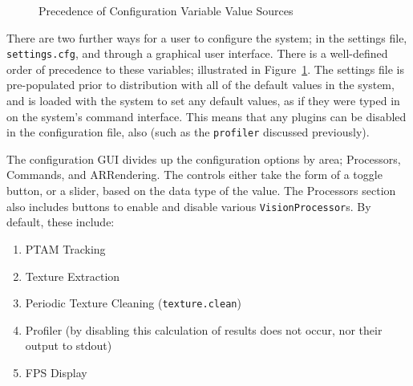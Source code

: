 \documentclass[a4paper,10pt]{report}
\begin{document}
\begin{figure}[h]
  \begin{center}
  \end{center}
  \caption{Precedence of Configuration Variable Value Sources}
  \label{configprecedence}
\end{figure}

There are two further ways for a user to configure the system; in the settings file, \texttt{settings.cfg}, and through a graphical user interface. There is a well-defined order of precedence to these variables; illustrated in Figure~\ref{configprecedence}. The settings file is pre-populated prior to distribution with all of the default values in the system, and is loaded with the system to set any default values, as if they were typed in on the system's command interface. This means that any plugins can be disabled in the configuration file, also (such as the \texttt{profiler} discussed previously).

The configuration GUI divides up the configuration options by area; Processors, Commands, and ARRendering. The controls either take the form of a toggle button, or a slider, based on the data type of the value. The Processors section also includes buttons to enable and disable various \texttt{VisionProcessor}s. By default, these include:

\begin{enumerate}
\item{PTAM Tracking}
\item{Texture Extraction}
\item{Periodic Texture Cleaning (\texttt{texture.clean})}
\item{Profiler (by disabling this calculation of results does not occur, nor their output to stdout)}
\item{FPS Display}
\end{enumerate}
\end{document}
